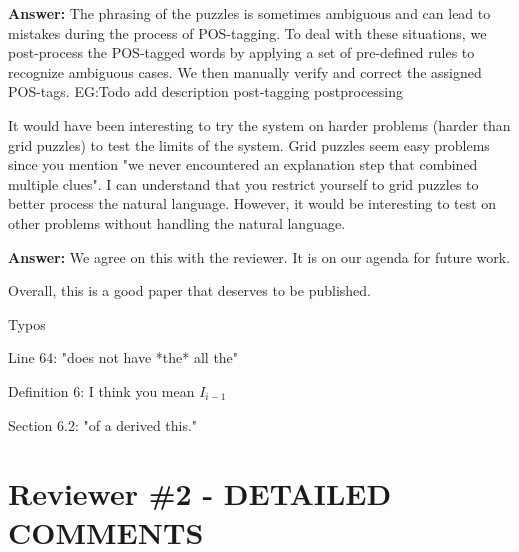 \documentclass{article}
\newcommand\comment[1]{\marginpar{\tiny #1}}
\renewcommand\comment[1]{#1}
\newcommand{\tias}[1]{{\comment{\color{blue}\textsc{TG:}#1}}}
\newcommand{\emilio}[1]{{\comment{\color{red} \textsc{EG:}#1}}}
\newcommand{\answer}[1]{{\comment{\textbf{Answer:} #1}}}
\newcommand{\new}[1]{{\comment{{\color{blue} #1}}}}
\begin{document}
\answer{The phrasing of the puzzles is sometimes ambiguous and can lead to mistakes during the process of POS-tagging. To deal with these situations, we post-process the POS-tagged words by applying a set of pre-defined rules to recognize ambiguous cases. We then manually verify and correct the assigned POS-tags.}
\emilio{Todo add description post-tagging postprocessing} 

\begin{quoteit}
It would have been interesting to try the system on harder problems (harder than grid puzzles) to test the limits of the system.  Grid puzzles seem easy problems since you mention "we never encountered an explanation step that combined multiple clues".  I can understand that you restrict yourself to grid puzzles to better process the natural language. However, it would be interesting to test on other problems without handling the natural language.
\end{quoteit}

\answer{We agree on this with the reviewer. It is on our agenda for future work.}

\begin{quoteit}
Overall, this is a good paper that deserves to be published. 

Typos

Line 64: "does not have *the* all the"

Definition 6: I think you mean $I_{i-1}
$

Section 6.2: "of a derived this."
\end{quoteit}


\section*{Reviewer \#2 - DETAILED COMMENTS}
\end{document}
